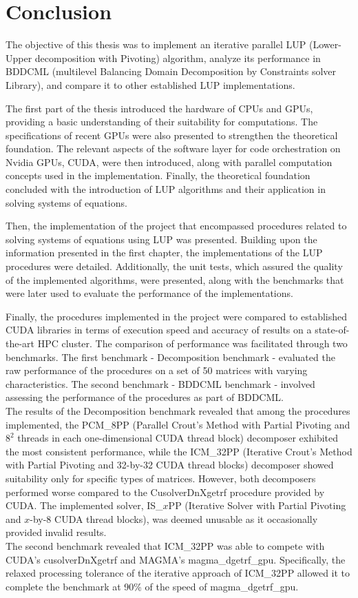 \chapter*{Conclusion}				   	   %

The objective of this thesis was to implement an iterative parallel LUP (Lower-Upper decomposition with Pivoting) algorithm, analyze its performance in BDDCML (multilevel Balancing Domain Decomposition by Constraints solver Library), and compare it to other established LUP implementations.

The first part of the thesis introduced the hardware of CPUs and GPUs, providing a basic understanding of their suitability for computations.
The specifications of recent GPUs were also presented to strengthen the theoretical foundation.
The relevant aspects of the software layer for code orchestration on Nvidia GPUs, CUDA, were then introduced, along with parallel computation concepts used in the implementation.
Finally, the theoretical foundation concluded with the introduction of LUP algorithms and their application in solving systems of equations.

Then, the implementation of the project that encompassed procedures related to solving systems of equations using LUP was presented.
Building upon the information presented in the first chapter, the implementations of the LUP procedures were detailed.
Additionally, the unit tests, which assured the quality of the implemented algorithms, were presented, along with the benchmarks that were later used to evaluate the performance of the implementations.

Finally, the procedures implemented in the project were compared to established CUDA libraries in terms of execution speed and accuracy of results on a state-of-the-art HPC cluster.
The comparison of performance was facilitated through two benchmarks.
The first benchmark - Decomposition benchmark - evaluated the raw performance of the procedures on a set of 50 matrices with varying characteristics.
The second benchmark - BDDCML benchmark - involved assessing the performance of the procedures as part of BDDCML.\\
The results of the Decomposition benchmark revealed that among the procedures implemented, the PCM\_8PP (Parallel Crout's Method with Partial Pivoting and $8^2$ threads in each one-dimensional CUDA thread block) decomposer exhibited the most consistent performance, while the ICM\_32PP (Iterative Crout's Method with Partial Pivoting and 32-by-32 CUDA thread blocks) decomposer showed suitability only for specific types of matrices.
However, both decomposers performed worse compared to the CusolverDnXgetrf procedure provided by CUDA.
The implemented solver, IS\_$x$PP (Iterative Solver with Partial Pivoting and $x$-by-8 CUDA thread blocks), was deemed unusable as it occasionally provided invalid results.\\
The second benchmark revealed that ICM\_32PP was able to compete with CUDA's cusolverDnXgetrf and MAGMA's magma\_dgetrf\_gpu.
Specifically, the relaxed processing tolerance of the iterative approach of ICM\_32PP allowed it to complete the benchmark at 90\% of the speed of magma\_dgetrf\_gpu.


